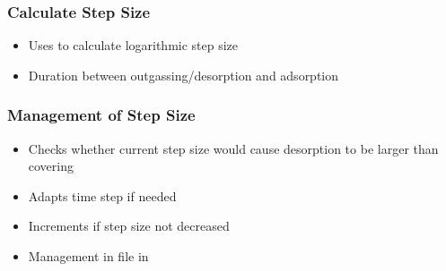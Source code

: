%

\subsubsection{Calculate Step Size}
\begin{itemize}[noitemsep,topsep=0pt]
\item Uses  to calculate logarithmic step size
\item Duration between outgassing/desorption and adsorption
\end{itemize}

\subsubsection{Management of Step Size}
\begin{itemize}[noitemsep,topsep=0pt]
\item Checks whether current step size would cause desorption to be larger than covering 
\item Adapts time step if needed
\item Increments if step size not decreased
\item Management in  file in 
\end{itemize}

